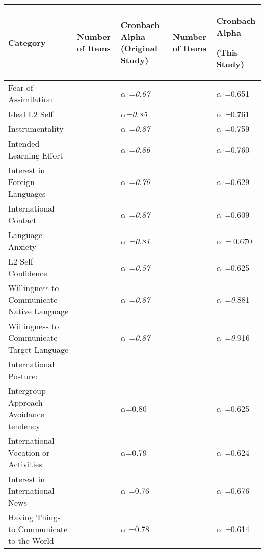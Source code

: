 \documentclass[12pt]{article}
\begin{document}
\begin{flushleft}
\tablehead{}
\begin{supertabular}{|m{1.1212599in}|m{1.1212599in}|m{1.1212599in}|m{1.1212599in}|m{1.1219599in}|}
\hline
\bfseries Category  &
\bfseries Number of Items &
\bfseries Cronbach Alpha (Original Study) &
\bfseries Number of Items &
{\bfseries Cronbach Alpha}

\bfseries (This Study)\\\hline
\mdseries Fear of Assimilation  &
 &
\mdseries \textit{$\alpha $ =0.67 } &
 &
\mdseries \textit{$\alpha $ =}0.651\\\hline
\mdseries Ideal L2 Self  &
 &
\mdseries \textit{$\alpha $=0.85 } &
 &
\mdseries \textit{$\alpha $ =}0.761\\\hline
\mdseries Instrumentality  &
 &
\mdseries \textit{$\alpha $ =0.87 } &
 &
\mdseries \textit{$\alpha $ =}0.759\\\hline
\mdseries Intended Learning Effort  &
 &
\mdseries \textit{$\alpha $ =0.86 } &
 &
\mdseries \textit{$\alpha $ =}0.760\\\hline
\mdseries Interest in Foreign Languages  &
 &
\mdseries \textit{$\alpha $ =0.70 } &
 &
\mdseries \textit{$\alpha $ =}0.629\\\hline
\mdseries International Contact  &
 &
\mdseries \textit{$\alpha $ =0.87 } &
 &
\mdseries \textit{$\alpha $ =}0.609\\\hline
\mdseries Language Anxiety  &
 &
\mdseries \textit{$\alpha $ =0.81 } &
 &
\mdseries \textit{$\alpha $ =} 0.670\\\hline
\mdseries L2 Self Confidence  &
 &
\mdseries \textit{$\alpha $ =0.57 } &
 &
\mdseries \textit{$\alpha $ =}0.625\\\hline
\mdseries Willingness to Communicate Native Language &
 &
\mdseries \textit{$\alpha $ =0.87 } &
 &
\mdseries \textit{$\alpha $ =0.}881\\\hline
\mdseries Willingness to Communicate Target Language &
 &
\mdseries \textit{$\alpha $ =0.87} &
 &
\mdseries \textit{$\alpha $ =0.}916\\\hline
\mdseries International Posture:  &
 &
 &
 &
\\\hline
\mdseries Intergroup Approach-Avoidance tendency  &
 &
\mdseries $\alpha $=0.80  &
 &
\mdseries \textit{$\alpha $ =}0.625\\\hline
\mdseries International Vocation or Activities  &
 &
\mdseries $\alpha $=0.79  &
 &
\mdseries \textit{$\alpha $ =}0.624\\\hline
\mdseries Interest in International News  &
 &
\mdseries $\alpha $ =0.76  &
 &
\mdseries \textit{$\alpha $ =}0.676\\\hline
\mdseries Having Things to Communicate to the World  &
 &
\mdseries $\alpha $ =0.78  &
 &
\mdseries \textit{$\alpha $ =}0.614\\\hline
\end{supertabular}
\end{flushleft}
\end{document}
